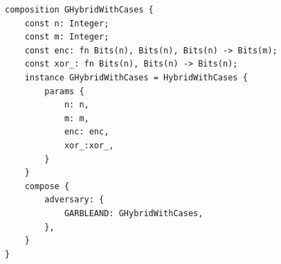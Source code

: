 \begin{longlisting}
\begin{verbatim}
composition GHybridWithCases {
    const n: Integer; 
    const m: Integer;  
    const enc: fn Bits(n), Bits(n), Bits(n) -> Bits(m); 
    const xor_: fn Bits(n), Bits(n) -> Bits(n);
    instance GHybridWithCases = HybridWithCases {
        params {
            n: n,
            m: m,
            enc: enc,
            xor_:xor_,
        }
    }
    compose {
        adversary: {
            GARBLEAND: GHybridWithCases,
        },
    }
}
\end{verbatim}
\caption{Composition }
\label{lst:domino-composition-ghybridwithcases}
\end{longlisting}